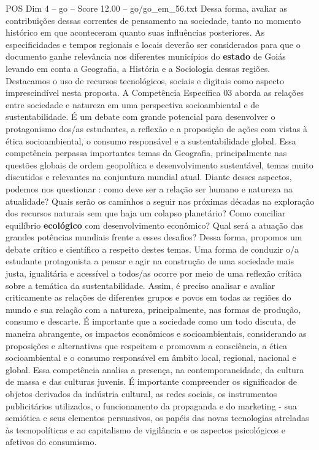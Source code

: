 \begin{textsample}{POS Dim 4 – go – Score 12.00 – go/go\_em\_56.txt}
Dessa forma, avaliar as contribuições dessas correntes de pensamento na sociedade, tanto no momento histórico em que aconteceram quanto suas influências posteriores.
As especificidades e tempos regionais e locais deverão ser considerados para que o documento ganhe relevância nos diferentes municípios do \textbf{estado} de Goiás levando em conta a Geografia, a História e a Sociologia dessas regiões.
Destacamos o uso de recursos tecnológicos, sociais e digitais como aspecto imprescindível nesta proposta.
A Competência Específica 03 aborda as relações entre sociedade e natureza em uma perspectiva socioambiental e de sustentabilidade.
É um debate com grande potencial para desenvolver o protagonismo dos/as estudantes, a reflexão e a proposição de ações com vistas à ética socioambiental, o consumo responsável e a sustentabilidade global.
Essa competência perpassa importantes temas da Geografia, principalmente nas questões globais de ordem geopolítica e desenvolvimento sustentável, temas muito discutidos e relevantes na conjuntura mundial atual.
Diante desses aspectos, podemos nos questionar : como deve ser a relação ser humano e natureza na atualidade?
Quais serão os caminhos a seguir nas próximas décadas na exploração dos recursos naturais sem que haja um colapso planetário?
Como conciliar equilíbrio \textbf{ecológico} com desenvolvimento econômico?
Qual será a atuação das grandes potências mundiais frente a esses desafios?
Dessa forma, propomos um debate crítico e científico a respeito destes temas.
Uma forma de conduzir o/a estudante protagonista a pensar e agir na construção de uma sociedade mais justa, igualitária e acessível a todos/as ocorre por meio de uma reflexão crítica sobre a temática da sustentabilidade.
Assim, é preciso analisar e avaliar criticamente as relações de diferentes grupos e povos em todas as regiões do mundo e sua relação com a natureza, principalmente, nas formas de produção, consumo e descarte.
É importante que a sociedade como um todo discuta, de maneira abrangente, os impactos econômicos e socioambientais, considerando as proposições e alternativas que respeitem e promovam a consciência, a ética socioambiental e o consumo responsável em âmbito local, regional, nacional e global.
Essa competência analisa a presença, na contemporaneidade, da cultura de massa e das culturas juvenis.
É importante compreender os significados de objetos derivados da indústria cultural, as redes sociais, os instrumentos publicitários utilizados, o funcionamento da propaganda e do marketing - sua semiótica e seus elementos persuasivos, os papéis das novas tecnologias atreladas às tecnopolíticas e ao capitalismo de vigilância e os aspectos psicológicos e afetivos do consumismo.

\end{textsample}
